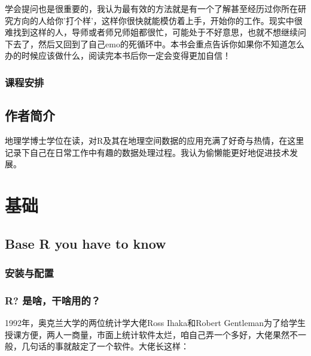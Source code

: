 \documentclass[
]{book}
\begin{document}
学会提问也是很重要的，我认为最有效的方法就是有一个了解甚至经历过你所在研究方向的人给你'打个样'，这样你很快就能模仿着上手，开始你的工作。现实中很难找到这样的人，导师或者师兄师姐都很忙，可能处于不好意思，也就不想继续问下去了，然后又回到了自己emo的死循环中。本书会重点告诉你如果你不知道怎么办的时候应该做什么，阅读完本书后你一定会变得更加自信！

\hypertarget{ux8bfeux7a0bux5b89ux6392}{%
\section{\texorpdfstring{\textbf{课程安排}}{课程安排}}\label{ux8bfeux7a0bux5b89ux6392}}

\hypertarget{author}{%
\chapter*{作者简介}\label{author}}

地理学博士学位在读，对R及其在地理空间数据的应用充满了好奇与热情，在这里
记录下自己在日常工作中有趣的数据处理过程。我认为偷懒能更好地促进技术发展。

\hypertarget{part-ux57faux7840}{%
\part{基础}\label{part-ux57faux7840}}

\hypertarget{base-r-you-have-to-know}{%
\chapter{Base R you have to know}\label{base-r-you-have-to-know}}

\hypertarget{ux5b89ux88c5ux4e0eux914dux7f6e}{%
\section{安装与配置}\label{ux5b89ux88c5ux4e0eux914dux7f6e}}

\hypertarget{r-ux662fux5565ux5e72ux5565ux7528ux7684}{%
\section{R? 是啥，干啥用的？}\label{r-ux662fux5565ux5e72ux5565ux7528ux7684}}

1992年，奥克兰大学的两位统计学大佬Ross Ihaka和Robert Gentleman为了给学生授课方便，两人一商量，市面上统计软件太烂，咱自己弄一个多好，大佬果然不一般，几句话的事就敲定了一个软件。大佬长这样：\\
\end{document}
